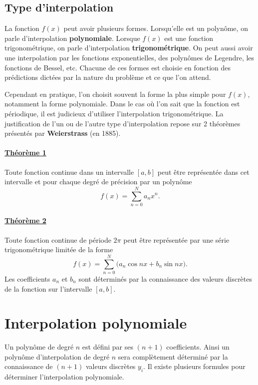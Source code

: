 \subsection{Type d'interpolation}

La fonction $f(x)$ peut avoir plusieurs formes. Lorsqu'elle est un polynôme,
on parle d'interpolation \textbf{polynomiale}. Lorsque $f(x)$ est une fonction
trigonométrique, on parle d'interpolation \textbf{trigonométrique}. On peut
aussi avoir une interpolation par les fonctions exponentielles, des polynômes
de Legendre, les fonctions de Bessel, etc. Chacune de ces formes est choisie
en fonction des prédictions dictées par la nature du problème et ce que l'on
attend.

Cependant en pratique, l'on choisit souvent la forme la plus simple pour
$f(x)$, notamment la forme polynomiale. Dans le cas où l'on sait que la
fonction est périodique, il est judicieux d'utiliser l'interpolation
trigonométrique. La justification de l'un ou de l'autre type d'interpolation
repose sur 2 théorèmes présentés par \textbf{Weierstrass} (en 1885).

\paragraph{\underline{Théorème 1}} Toute fonction continue dans un intervalle
$[a,b]$ peut être représentée dans cet intervalle et pour chaque degré de
précision par un polynôme
\[
  f(x) = \sum_{n=0}^{N} a_n x^n .
\]

\paragraph{\underline{Théorème 2}} Toute fonction continue de période $2\pi$
peut être représentée par une série trigonométrique limitée de la forme
\[
  f(x) = \sum_{n=0}^{N} \bigl(a_n\cos nx + b_n\sin nx\bigr).
\]
Les coefficients $a_n$ et $b_n$ sont déterminés par la connaissance des
valeurs discrètes de la fonction sur l'intervalle $[a,b]$.

\section{Interpolation polynomiale}

Un polynôme de degré $n$ est défini par ses $(n+1)$ coefficients. Ainsi un
polynôme d'interpolation de degré $n$ sera complètement déterminé par la
connaissance de $(n+1)$ valeurs discrètes $y_i$. Il existe plusieurs formules
pour déterminer l'interpolation polynomiale.

